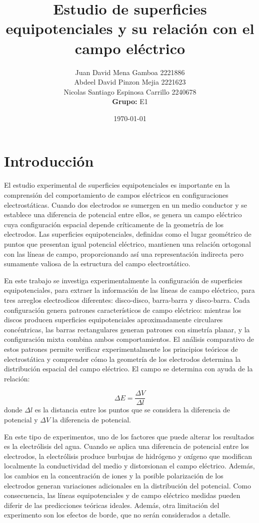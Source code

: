 \documentclass[11pt,twocolumn]{article}
\title{\textbf{Estudio de superficies equipotenciales y su relación con el campo eléctrico}}
\author{%
  Juan David Mena Gamboa 2221886\\
  Abdeel David Pinzon Mejia 2221623\\
  Nicolas Santiago Espinosa Carrillo 2240678\\
  \textbf{Grupo:} E1
}
\date{\today}
\begin{document}
\maketitle
\thispagestyle{fancy}

\section{Introducción}
El estudio experimental de superficies equipotenciales es importante en la comprensión del comportamiento de campos eléctricos en configuraciones electrostáticas. Cuando dos electrodos se sumergen en un medio conductor y se establece una diferencia de potencial entre ellos, se genera un campo eléctrico cuya configuración espacial depende críticamente de la geometría de los electrodos. Las superficies equipotenciales, definidas como el lugar geométrico de puntos que presentan igual potencial eléctrico, mantienen una relación ortogonal con las líneas de campo, proporcionando así una representación indirecta pero sumamente valiosa de la estructura del campo electrostático.

En este trabajo se investiga experimentalmente la configuración de superficies equipotenciales, para extraer la información de las líneas de campo eléctrico, para tres arreglos electrodicos diferentes: disco-disco, barra-barra y disco-barra. Cada configuración genera patrones característicos de campo eléctrico: mientras los discos producen superficies equipotenciales aproximadamente circulares concéntricas, las barras rectangulares generan patrones con simetría planar, y la configuración mixta combina ambos comportamientos. El análisis comparativo de estos patrones permite verificar experimentalmente los principios teóricos de electrostática y comprender cómo la geometría de los electrodos determina la distribución espacial del campo eléctrico. El campo se determina con ayuda de la relación:

\[\Delta E = \frac{\Delta V}{\Delta l}\] donde \(\Delta l\) es la distancia entre los puntos que se considera la diferencia de potencial y \(\Delta V\) la diferencia de potencial.

En este tipo de experimentos, uno de los factores que puede alterar los resultados es la electrólisis del agua. Cuando se aplica una diferencia de potencial entre los electrodos, la electrólisis produce burbujas de hidrógeno y oxígeno que modifican localmente la conductividad del medio y distorsionan el campo eléctrico. Además, los cambios en la concentración de iones y la posible polarización de los electrodos generan variaciones adicionales en la distribución del potencial. Como consecuencia, las líneas equipotenciales y de campo eléctrico medidas pueden diferir de las predicciones teóricas ideales. Además, otra limitación del experimento son los efectos de borde, que no serán considerados a detalle.
\end{document}
